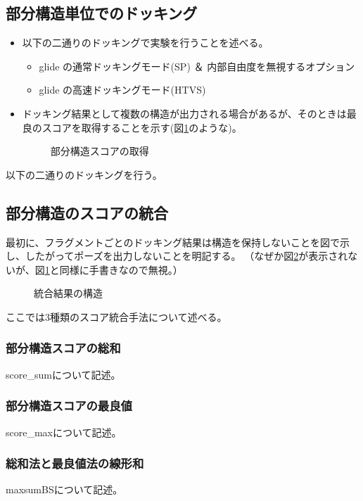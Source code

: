 \subsection{部分構造単位でのドッキング}
\begin{itemize}
\item 以下の二通りのドッキングで実験を行うことを述べる。
	\begin{itemize}
	\item glide の通常ドッキングモード(SP) ＆ 内部自由度を無視するオプション
	\item glide の高速ドッキングモード(HTVS)
	\end{itemize}
\item ドッキング結果として複数の構造が出力される場合があるが、そのときは最良のスコアを取得することを示す(図\ref{fig:fragment_result}のような)。
	\begin{figure}[htp]
	 \begin{center}
	  \caption{部分構造スコアの取得}
	  \label{fig:fragment_result}
	 \end{center}
	\end{figure}
\end{itemize}
以下の二通りのドッキングを行う。

\subsection{部分構造のスコアの統合}
最初に、フラグメントごとのドッキング結果は構造を保持しないことを図で示し、したがってポーズを出力しないことを明記する。
（なぜか図\ref{fig:fragment_docking_result}が表示されないが、図\ref{fig:fragment_result}と同様に手書きなので無視。）
\begin{figure}[htp]
 \begin{center}
  \caption{統合結果の構造}
  \label{fig:fragment_docking_result}
 \end{center}
\end{figure}

ここでは3種類のスコア統合手法について述べる。
\subsubsection{部分構造スコアの総和}
score\_sumについて記述。
\subsubsection{部分構造スコアの最良値}
score\_maxについて記述。
\subsubsection{総和法と最良値法の線形和}
maxsumBSについて記述。

